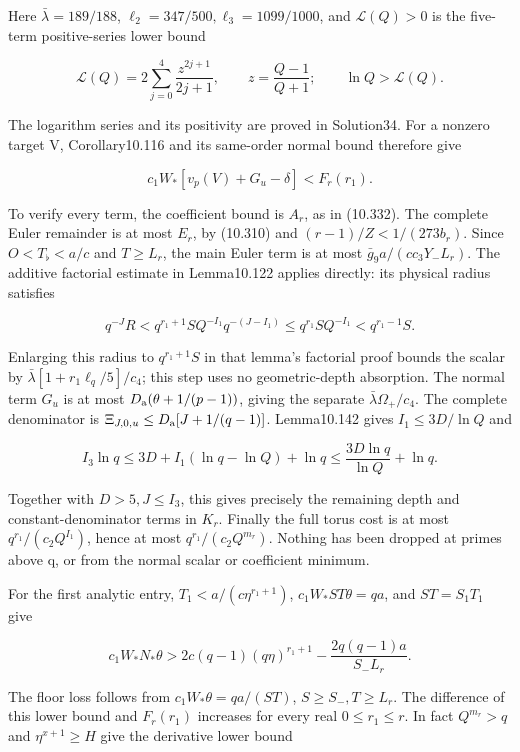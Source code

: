 \documentclass[
  11pt,
  a4paper,
]{article}
\begin{document}
Here \(\bar\lambda=189/188\), \(\ell_2=347/500,\ell_3=1099/1000\), and
\(\mathcal L(Q)>0\) is the five-term positive-series lower bound

\[
\mathcal L(Q)=2\sum_{j=0}^4\frac{z^{2j+1}}{2j+1},
\qquad z=\frac{Q-1}{Q+1};\qquad \ln Q>\mathcal L(Q).
\tag{10.421}
\]

The logarithm series and its positivity are proved in Solution34. For a
nonzero target V, Corollary10.116 and its same-order normal bound
therefore give

\[
c_1W_*[v_p(V)+G_u-\delta]<F_r(r_1).
\tag{10.422}
\]

To verify every term, the coefficient bound is \(A_r\), as in (10.332).
The complete Euler remainder is at most \(E_r\), by (10.310) and
\((r-1)/Z<1/(273b_r)\). Since \(O<T_\flat<a/c\) and \(T\ge L_r\), the
main Euler term is at most \(\bar g_9a/(cc_3Y_-L_r)\). The additive
factorial estimate in Lemma10.122 applies directly: its physical radius
satisfies

\[
q^{-J}R<q^{r_1+1}S Q^{-I_1}q^{-(J-I_1)}
\le q^{r_1}S Q^{-I_1}<q^{r_1-1}S.
\tag{10.423}
\]

Enlarging this radius to \(q^{r_1+1}S\) in that lemma's factorial proof
bounds the scalar by \(\bar\lambda[1+r_1\ell_q/5]/c_4\); this step uses
no geometric-depth absorption. The normal term \(G_u\) is at most
\(D_{\rm a}(\theta+1/(p-1))\), giving the separate
\(\bar\lambda\Omega_+/c_4\). The complete denominator is
\(\Xi_{J,0,u}\le D_{\rm a}[J+1/(q-1)]\). Lemma10.142 gives
\(I_1\le3D/\ln Q\) and

\[
I_3\ln q\le3D+I_1(\ln q-\ln Q)+\ln q
\le\frac{3D\ln q}{\ln Q}+\ln q.
\tag{10.424}
\]

Together with \(D>5,J\le I_3\), this gives precisely the remaining depth
and constant-denominator terms in \(K_r\). Finally the full torus cost
is at most \(q^{r_1}/(c_2Q^{I_1})\), hence at most
\(q^{r_1}/(c_2Q^{m_r})\). Nothing has been dropped at primes above q, or
from the normal scalar or coefficient minimum.

For the first analytic entry, \(T_1<a/(c\eta^{r_1+1})\),
\(c_1W_*ST\theta=qa\), and \(ST=S_1T_1\) give

\[
c_1W_*N_*\theta>
2c(q-1)(q\eta)^{r_1+1}
-\frac{2q(q-1)a}{S_-L_r}.
\tag{10.425}
\]

The floor loss follows from \(c_1W_*\theta=qa/(ST)\),
\(S\ge S_-,T\ge L_r\). The difference of this lower bound and
\(F_r(r_1)\) increases for every real \(0\le r_1\le r\). In fact
\(Q^{m_r}>q\) and \(\eta^{x+1}\ge H\) give the derivative lower bound
\end{document}
